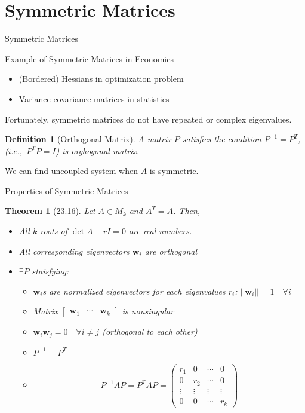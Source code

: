 \documentclass[a4paper,11pt]{article}
\newtheorem{defn}{Definition}
\newtheorem{thm}{Theorem}
\newcommand{\bd}{\mathbf}
\begin{document}
\section{Symmetric Matrices} %
\label{sec:symmetric_matrices}
\begin{frame}[t]{Symmetric Matrices}
	\begin{block}
		{Example of Symmetric Matrices in Economics}
		\begin{itemize}
			\item (Bordered) Hessians in optimization problem
			\item Variance-covariance matrices in statistics
		\end{itemize}
		Fortunately, symmetric matrices do not have repeated or complex eigenvalues. 
	\end{block}
	\begin{defn}
		[Orthogonal Matrix] A matrix $P$ satisfies the condition $P^{-1}=P^T$, ($i.e.,$ $P^T P = I$) is \uline{orghogonal matrix}.
	\end{defn}
	We can find uncoupled system when $A$ is symmetric.
\end{frame}
\begin{frame}[t]{Properties of Symmetric Matrices}
	\begin{thm}
		[23.16] Let $A\in M_k$ and $A^T=A$. Then, 
		\begin{itemize}
			\item All $k$ roots of $\det{A-rI}=0$ are real numbers. 
			\item All corresponding eigenvectors $\bd{w}_i$ are orthogonal
			\item $\exists P$ staisfying:
			\begin{itemize}
				\item $\bd{w}_i$s are normalized eigenvectors for each eigenvalues $r_i$: $||\bd{w}_i||=1 \quad\forall i$
				\item Matrix $\begin{bmatrix}\bd{w}_1&\cdots&\bd{w}_k
				\end{bmatrix}$ is nonsingular
				\item $\bd{w}_i\bd{w}_j=0\quad \forall i\neq j$ (orthogonal to each other)
				\item $P^{-1}=P^T$
				\item \[
					P^{-1}AP = P^TAP = \begin{pmatrix}
						r_1 & 0 & \cdots & 0\\
						0 & r_2 & \cdots & 0\\
						\vdots & \vdots & \vdots & \vdots\\
						0 & 0 & \cdots & r_k
					\end{pmatrix}
				\]
			\end{itemize}
		\end{itemize}
	\end{thm}
\end{frame}
\end{document}
